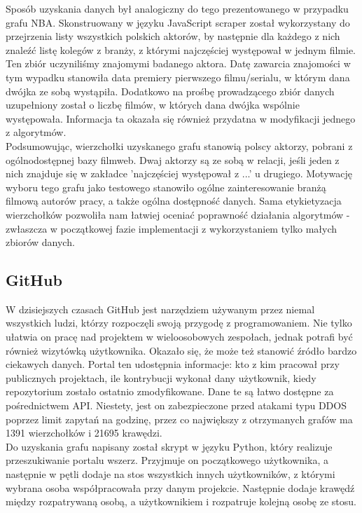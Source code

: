 \documentclass{article}
\begin{document}
Sposób uzyskania danych był analogiczny do tego prezentowanego w przypadku grafu NBA. Skonstruowany w języku JavaScript scraper został wykorzystany do przejrzenia listy wszystkich polskich aktorów, by następnie dla każdego z nich znaleźć listę kolegów z branży, z którymi najczęściej występował w jednym filmie. Ten zbiór uczyniliśmy znajomymi badanego aktora. Datę zawarcia znajomości w tym wypadku stanowiła data premiery pierwszego filmu/serialu, w którym dana dwójka ze sobą wystąpiła. Dodatkowo na prośbę prowadzącego zbiór danych uzupełniony został o liczbę filmów, w których dana dwójka wspólnie występowała. Informacja ta okazała się również przydatna w modyfikacji jednego z algorytmów.\\

Podsumowując, wierzchołki uzyskanego grafu stanowią polscy aktorzy, pobrani z ogólnodostępnej bazy filmweb. Dwaj aktorzy są ze sobą w relacji, jeśli jeden z nich znajduje się w zakładce 'najczęściej występował z ...' u drugiego. Motywację wyboru tego grafu jako testowego stanowiło ogólne zainteresowanie branżą filmową autorów pracy, a także ogólna dostępność danych. Sama etykietyzacja wierzchołków pozwoliła nam łatwiej oceniać poprawność działania algorytmów - zwłaszcza w początkowej fazie implementacji z wykorzystaniem tylko małych zbiorów danych.

\subsection{GitHub}
W dzisiejszych czasach GitHub jest narzędziem używanym przez niemal
wszystkich ludzi, którzy rozpoczęli swoją przygodę z programowaniem. Nie tylko ułatwia on pracę nad projektem w wieloosobowych zespołach, jednak potrafi być również wizytówką użytkownika. Okazało się, że może też stanowić źródło bardzo ciekawych danych. Portal ten udostępnia informacje: kto z kim pracował przy publicznych projektach, ile kontrybucji wykonał dany użytkownik, kiedy repozytorium zostało ostatnio zmodyfikowane. Dane te są łatwo dostępne za pośrednictwem API. Niestety, jest on zabezpieczone przed atakami typu DDOS poprzez limit zapytań na godzinę, przez co największy z otrzymanych grafów ma 1391 wierzchołków i 21695 krawędzi.\\

Do uzyskania grafu napisany został skrypt w języku Python, który realizuje przeszukiwanie portalu wszerz. Przyjmuje on początkowego użytkownika, a następnie w pętli dodaje na stos wszystkich innych użytkowników, z którymi wybrana osoba współpracowała przy danym projekcie. Następnie dodaje krawędź między rozpatrywaną osobą, a użytkownikiem i rozpatruje kolejną osobę ze stosu.\\
\end{document}

